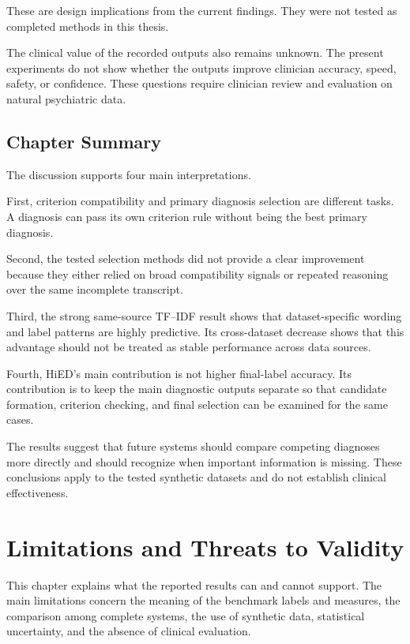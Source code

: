 \documentclass[12pt,a4paper,oneside]{report}
\begin{document}
These are design implications from the current findings. They were not
tested as completed methods in this thesis.

The clinical value of the recorded outputs also remains unknown. The
present experiments do not show whether the outputs improve clinician
accuracy, speed, safety, or confidence. These questions require
clinician review and evaluation on natural psychiatric data.

\section{Chapter Summary}

The discussion supports four main interpretations.

First, criterion compatibility and primary diagnosis selection are
different tasks. A diagnosis can pass its own criterion rule without
being the best primary diagnosis.

Second, the tested selection methods did not provide a clear improvement
because they either relied on broad compatibility signals or repeated
reasoning over the same incomplete transcript.

Third, the strong same-source TF--IDF result shows that dataset-specific
wording and label patterns are highly predictive. Its cross-dataset
decrease shows that this advantage should not be treated as stable
performance across data sources.

Fourth, HiED's main contribution is not higher final-label accuracy. Its
contribution is to keep the main diagnostic outputs separate so that
candidate formation, criterion checking, and final selection can be
examined for the same cases.

The results suggest that future systems should compare competing
diagnoses more directly and should recognize when important information
is missing. These conclusions apply to the tested synthetic datasets and
do not establish clinical effectiveness.

\chapter{Limitations and Threats to Validity}
\label{ch:limitations}

This chapter explains what the reported results can and cannot support.
The main limitations concern the meaning of the benchmark labels and
measures, the comparison among complete systems, the use of synthetic
data, statistical uncertainty, and the absence of clinical evaluation.
\end{document}
